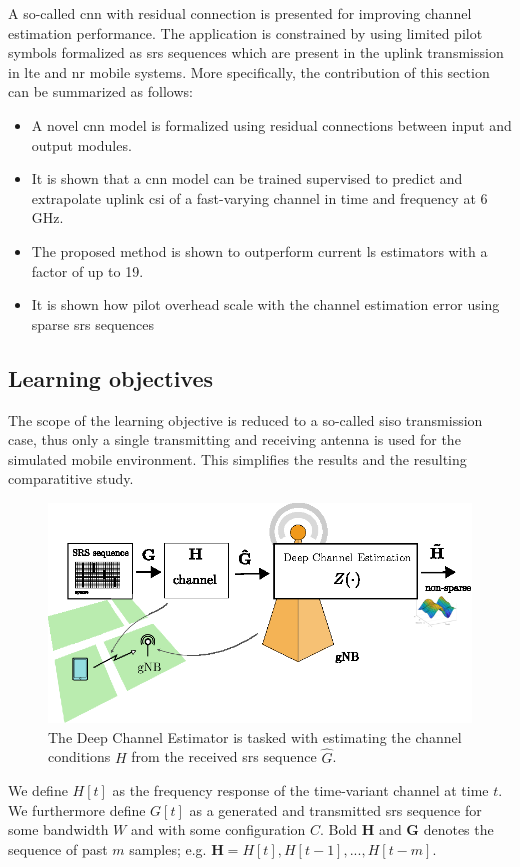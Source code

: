A so-called \gls{cnn} with residual connection is presented for improving channel estimation performance. The application is constrained by using limited pilot symbols formalized as \gls{srs} sequences which are present in the uplink transmission in \gls{lte} and \gls{nr} mobile systems. More specifically, the contribution of this section can be summarized as follows:
\begin{itemize}
\item A novel \gls{cnn} model is formalized using residual connections between input and output modules.
\item It is shown that a \gls{cnn} model can be trained supervised to predict and extrapolate uplink \gls{csi} of a fast-varying channel in time and frequency at $6$ GHz.
\item The proposed method is shown to outperform current \gls{ls} estimators with a factor of up to 19.
\item It is shown how pilot overhead scale with the channel estimation error using sparse \gls{srs} sequences
\end{itemize}


\subsection{Learning objectives}
The scope of the learning objective is reduced to a so-called \gls{siso} transmission case, thus only a single transmitting and receiving antenna is used for the simulated mobile environment. This simplifies the results and the resulting comparatitive study.
\begin{figure}
    \centering
    \includegraphics{chapters/part_uplink/figures/channel_estimation_approach_v2.eps}
    \caption{The Deep Channel Estimator is tasked with estimating the channel conditions $H$ from the received \gls{srs} sequence $\hat{G}$.}
    \label{fig:my_label}
\end{figure}
We define $H[t]$ as the frequency response of the time-variant channel at time $t$. We furthermore define $G[t]$ as a generated and transmitted \gls{srs} sequence for some bandwidth $W$ and with some configuration $C$. Bold $\mathbf{H}$ and $\mathbf{G}$ denotes the sequence of past $m$ samples; e.g. $\mathbf{H} = H[t],H[t-1],...,H[t-m]$.

